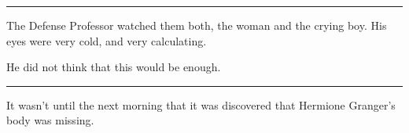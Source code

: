 \begin{center}\rule{3in}{0.4pt}\end{center}

The Defense Professor watched them both, the woman and the crying boy.
His eyes were very cold, and very calculating.

He did not think that this would be enough.

\begin{center}\rule{3in}{0.4pt}\end{center}

It wasn't until the next morning that it was discovered that Hermione
Granger's body was missing.
